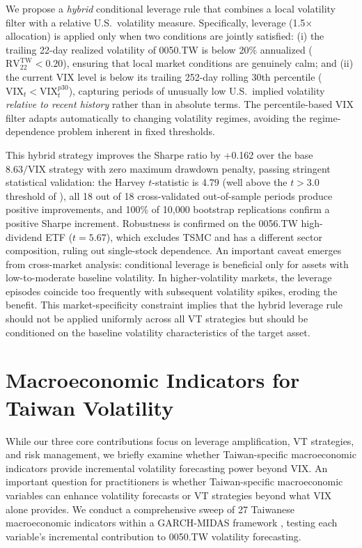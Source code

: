 We propose a \textit{hybrid} conditional leverage rule that combines a local volatility filter with a relative U.S.\ volatility measure. Specifically, leverage (1.5$\times$ allocation) is applied only when two conditions are jointly satisfied: (i) the trailing 22-day realized volatility of 0050.TW is below 20\% annualized ($\text{RV}_{22}^{\text{TW}} < 0.20$), ensuring that local market conditions are genuinely calm; and (ii) the current VIX level is below its trailing 252-day rolling 30th percentile ($\text{VIX}_t < \text{VIX}_{t}^{p30}$), capturing periods of unusually low U.S.\ implied volatility \textit{relative to recent history} rather than in absolute terms. The percentile-based VIX filter adapts automatically to changing volatility regimes, avoiding the regime-dependence problem inherent in fixed thresholds.

This hybrid strategy improves the Sharpe ratio by +0.162 over the base $8.63/\text{VIX}$ strategy with zero maximum drawdown penalty, passing stringent statistical validation: the Harvey $t$-statistic is 4.79 (well above the $t > 3.0$ threshold of \citealt{harvey2016}), all 18 out of 18 cross-validated out-of-sample periods produce positive improvements, and 100\% of 10,000 bootstrap replications confirm a positive Sharpe increment. Robustness is confirmed on the 0056.TW high-dividend ETF ($t = 5.67$), which excludes TSMC and has a different sector composition, ruling out single-stock dependence. An important caveat emerges from cross-market analysis: conditional leverage is beneficial only for assets with low-to-moderate baseline volatility. In higher-volatility markets, the leverage episodes coincide too frequently with subsequent volatility spikes, eroding the benefit. This market-specificity constraint implies that the hybrid leverage rule should not be applied uniformly across all VT strategies but should be conditioned on the baseline volatility characteristics of the target asset.



\section{Macroeconomic Indicators for Taiwan Volatility}
\label{sec:macro}

While our three core contributions focus on leverage amplification, VT strategies, and risk management, we briefly examine whether Taiwan-specific macroeconomic indicators provide incremental volatility forecasting power beyond VIX. An important question for practitioners is whether Taiwan-specific macroeconomic variables can enhance volatility forecasts or VT strategies beyond what VIX alone provides. We conduct a comprehensive sweep of 27 Taiwanese macroeconomic indicators within a GARCH-MIDAS framework \citep{engle2013}, testing each variable's incremental contribution to 0050.TW volatility forecasting.

